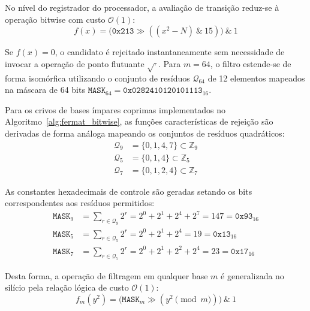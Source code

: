 \documentclass[12pt,a4paper]{article}
\theoremstyle{plain}
\begin{document}
No nível do registrador do processador, a avaliação de transição
reduz-se à operação bitwise com custo $\mathcal{O}(1)$:
\[
f(x) = \bigl( \mathtt{0x213} \gg ((x^2 - N) \ \& \ 15) \bigr) \ \& \ 1
\]

Se $f(x) = 0$, o candidato é rejeitado instantaneamente sem necessidade
de invocar a operação de ponto flutuante $\sqrt{\cdot}$.  Para $m = 64$,
o filtro estende-se de forma isomórfica utilizando o conjunto de resíduos
$\mathcal{Q}_{64}$ de 12 elementos mapeados na máscara de 64 bits
$\mathtt{MASK}_{64} = \mathtt{0x0282410120101113}_{16}$.

Para os crivos de bases ímpares coprimas implementados no
Algoritmo~\ref{alg:fermat_bitwise}, as funções características de
rejeição são derivadas de forma análoga mapeando os conjuntos de
resíduos quadráticos:
\begin{align*}
\mathcal{Q}_{9} &= \{0, 1, 4, 7\} \subset \mathbb{Z}_9 \\
\mathcal{Q}_{5} &= \{0, 1, 4\} \subset \mathbb{Z}_5 \\
\mathcal{Q}_{7} &= \{0, 1, 2, 4\} \subset \mathbb{Z}_7
\end{align*}

As constantes hexadecimais de controle são geradas setando os bits
correspondentes aos resíduos permitidos:
\begin{align*}
\mathtt{MASK}_{9}  &= \sum_{r \in \mathcal{Q}_9} 2^r
  = 2^0 + 2^1 + 2^4 + 2^7 = 147 = \mathtt{0x93}_{16} \\
\mathtt{MASK}_{5}  &= \sum_{r \in \mathcal{Q}_5} 2^r
  = 2^0 + 2^1 + 2^4 = 19 = \mathtt{0x13}_{16} \\
\mathtt{MASK}_{7}  &= \sum_{r \in \mathcal{Q}_7} 2^r
  = 2^0 + 2^1 + 2^2 + 2^4 = 23 = \mathtt{0x17}_{16}
\end{align*}

Desta forma, a operação de filtragem em qualquer base $m$ é
generalizada no silício pela relação lógica de custo $\mathcal{O}(1)$:
\[
f_m(y^2) = \bigl( \mathtt{MASK}_m \gg (y^2 \pmod m) \bigr) \ \& \ 1
\]
\end{document}

